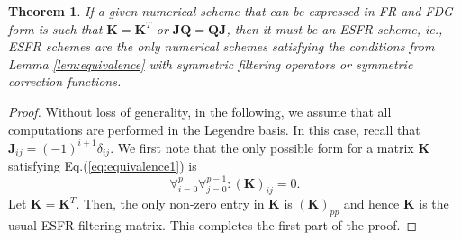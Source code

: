 \documentclass[preprint,12pt]{elsarticle}
\newtheorem{theorem}{Theorem}
\begin{document}
\begin{theorem}
    If a given numerical scheme that can be expressed in FR and FDG form is such that $\mathbf{K} = \mathbf{K}^T$ or $\mathbf{J}\mathbf{Q} = \mathbf{Q}\mathbf{J}$, then it must be an ESFR scheme, \textit{ie.}, ESFR schemes are the only numerical schemes satisfying the conditions from Lemma \ref{lem:equivalence} with symmetric filtering operators or symmetric correction functions.
\end{theorem}
\begin{proof}
Without loss of generality, in the following, we assume that all computations are performed in the Legendre basis. In this case, recall that $\mathbf{J}_{ij} = (-1)^{i+1} \delta_{ij}$. We first note that the only possible form for a matrix $\mathbf{K}$ satisfying Eq.(\ref{eq:equivalence1}) is
\begin{equation}
    \forall_{i=0}^p \forall_{j=0}^{p-1} : (\mathbf{K})_{ij} = 0.
    \label{eq:K_constraint}
\end{equation}
Let $\mathbf{K} = \mathbf{K}^T$. Then, the only non-zero entry in $\mathbf{K}$ is $(\mathbf{K})_{pp}$ and hence $\mathbf{K}$ is the usual ESFR filtering matrix. This completes the first part of the proof.


\end{proof}
\end{document}

